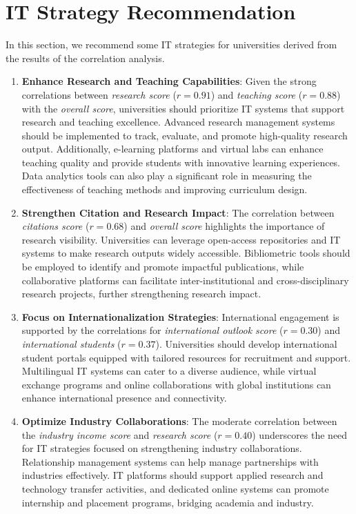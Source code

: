 \documentclass[conference]{IEEEtran}
\begin{document}
\section{IT Strategy Recommendation}

In this section, we recommend some IT strategies for universities derived from the results of the correlation analysis. 

\begin{enumerate}
	\item \textbf{Enhance Research and Teaching Capabilities}: Given the strong correlations between \textit{research score} (\(r = 0.91\)) and \textit{teaching score} (\(r = 0.88\)) with the \textit{overall score}, universities should prioritize IT systems that support research and teaching excellence. Advanced research management systems should be implemented to track, evaluate, and promote high-quality research output. Additionally, e-learning platforms and virtual labs can enhance teaching quality and provide students with innovative learning experiences. Data analytics tools can also play a significant role in measuring the effectiveness of teaching methods and improving curriculum design.
	
	\item \textbf{Strengthen Citation and Research Impact}: The correlation between \textit{citations score} (\(r = 0.68\)) and \textit{overall score} highlights the importance of research visibility. Universities can leverage open-access repositories and IT systems to make research outputs widely accessible. Bibliometric tools should be employed to identify and promote impactful publications, while collaborative platforms can facilitate inter-institutional and cross-disciplinary research projects, further strengthening research impact.
	
	
	
	\item \textbf{Focus on Internationalization Strategies}: International engagement is supported by the correlations for \textit{international outlook score} (\(r = 0.30\)) and \textit{international students} (\(r = 0.37\)). Universities should develop international student portals equipped with tailored resources for recruitment and support. Multilingual IT systems can cater to a diverse audience, while virtual exchange programs and online collaborations with global institutions can enhance international presence and connectivity.
	
	\item \textbf{Optimize Industry Collaborations}: The moderate correlation between the \textit{industry income score} and \textit{research score} (\(r = 0.40\)) underscores the need for IT strategies focused on strengthening industry collaborations. Relationship management systems can help manage partnerships with industries effectively. IT platforms should support applied research and technology transfer activities, and dedicated online systems can promote internship and placement programs, bridging academia and industry.
	

\end{enumerate}
\end{document}

